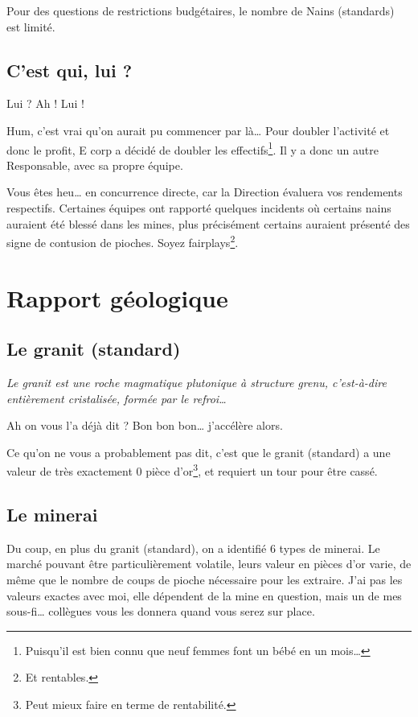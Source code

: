 Pour des questions de restrictions budgétaires, le nombre de Nains (standards) est limité.

\subsection{C'est qui, lui ?}
Lui ? Ah ! Lui !

Hum, c'est vrai qu'on aurait pu commencer par là\ldots{} Pour doubler l'activité et donc le profit, E corp a  décidé de doubler les effectifs\footnote{Puisqu'il est bien connu que neuf femmes font un bébé en un mois\ldots{}}. Il y a donc un autre Responsable, avec sa propre équipe.

Vous êtes heu\ldots{} en concurrence directe, car la Direction évaluera vos rendements respectifs. Certaines équipes ont rapporté quelques incidents où certains nains auraient été blessé dans les mines, plus précisément certains auraient présenté des signe de contusion de pioches. Soyez fairplays\footnote{Et rentables.}.

\newpage
\section{Rapport géologique}
\subsection{Le granit (standard)}
\textit{Le granit est une roche magmatique plutonique à structure grenu, c'est-à-dire entièrement cristalisée, formée par le refroi\ldots{}}

Ah on vous l'a déjà dit ? Bon bon bon\ldots{} j'accélère alors.

Ce qu'on ne vous a probablement pas dit, c'est que le granit (standard) a une valeur de très exactement 0 pièce d'or\footnote{Peut mieux faire en terme de rentabilité.}, et requiert un tour pour être cassé.


\subsection{Le minerai}
Du coup, en plus du granit (standard), on a identifié 6 types de minerai. 
Le marché pouvant être particulièrement volatile, leurs valeur en pièces d'or varie, de même que le nombre de coups de pioche nécessaire pour les extraire.
J'ai pas les valeurs exactes avec moi, elle dépendent de la mine en question, mais un de mes sous-fi\ldots{} collègues vous les donnera quand vous serez sur place.

